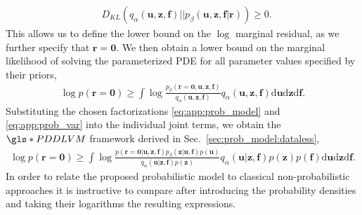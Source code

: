 \documentclass[11pt, fleqn]{article}
\def\z{{\mathbf z}}
\def\fbf{{\mathbf f}}
\def\ubf{{\mathbf u}}
\def\r{{\mathbf r}}
\def\md{{\mathrm d}}
\def\b0{{\mathbf 0}}
\begin{document}
\begin{align}
     &D_{KL}( q_\alpha(\ubf, \z, \fbf)||p_\beta(\ubf,\z,\fbf|\r)) \geq 0.
\end{align}
This allows us to define the lower bound on the $\log$ marginal residual, as we further specify that $\r = \b0$. We then obtain a lower bound on the marginal likelihood of solving the parameterized PDE for all parameter values specified by their priors,
\begin{align}
    \log p(\r=\b0) \geq \int \log \frac{p_\beta(\r=\b0,\ubf,\z,\fbf)}{q_\alpha(\ubf, \z, \fbf)}q_\alpha(\ubf, \z, \fbf)\md \ubf \md \z \md \fbf.
\end{align}
Substituting the chosen factorizations \eqref{eq:app:prob_model} and \eqref{eq:app:prob_var} into the individual joint terms, we obtain the $\gls*{PDDLVM}$ framework derived in Sec.~\ref{sec:prob_model:dataless},
\begin{align}
    \log p(\r=\b0) \geq \int \log \frac{p(\r=\b0|\ubf,\z, \fbf)p_\beta(\z|\ubf, \fbf)p(\ubf)}{q_\alpha(\ubf|\z,\fbf)p(\z)}q_\alpha(\ubf|\z,\fbf)p(\z)p(\fbf)\md \ubf \md \z \md \fbf.
\end{align}
%
In order to relate the proposed probabilistic model to classical non-probabilistic approaches it is instructive to compare after introducing the probability densities and taking their logarithms the resulting expressions. 

\end{document}
